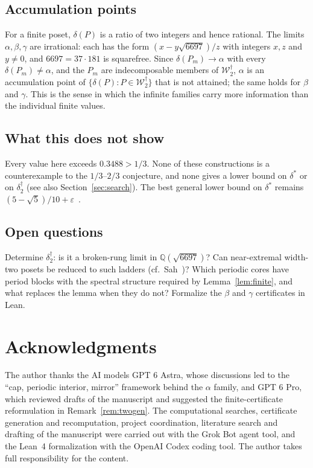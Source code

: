\documentclass[11pt]{amsart}
\theoremstyle{definition}
\theoremstyle{remark}
\newcommand{\Wdag}{\mathcal{W}_2^{\dagger}}
\newcommand{\deltadag}{\delta_2^{\dagger}}
\begin{document}
\subsection*{Accumulation points}
For a finite poset, $\delta(P)$ is a ratio of two integers and hence rational. The limits $\alpha,\beta,\gamma$ are irrational: each has the form $(x-y\sqrt{6697})/z$ with integers $x,z$ and $y\neq0$, and $6697=37\cdot181$ is squarefree. Since $\delta(P_m)\to\alpha$ with every $\delta(P_m)\ne\alpha$, and the $P_m$ are indecomposable members of $\Wdag$, $\alpha$ is an accumulation point of $\{\delta(P):P\in\Wdag\}$ that is not attained; the same holds for $\beta$ and $\gamma$. This is the sense in which the infinite families carry more information than the individual finite values.

\subsection*{What this does not show}
Every value here exceeds $0.3488>1/3$. None of these constructions is a counterexample to the $1/3$--$2/3$ conjecture, and none gives a lower bound on $\delta^*$ or on $\deltadag$ (see also Section~\ref{sec:search}). The best general lower bound on $\delta^*$ remains $(5-\sqrt5)/10+\varepsilon$~\cite{ACPP26}.

\subsection*{Open questions}
Determine $\deltadag$: is it a broken-rung limit in $\mathbb{Q}(\sqrt{6697})$? Can near-extremal width-two posets be reduced to such ladders (cf.\ Sah~\cite[\S5.1]{Sah21})? Which periodic cores have period blocks with the spectral structure required by Lemma~\ref{lem:finite}, and what replaces the lemma when they do not? Formalize the $\beta$ and $\gamma$ certificates in Lean.

\section*{Acknowledgments}
The author thanks the AI models GPT 6 Astra, whose discussions led to the ``cap, periodic interior, mirror'' framework behind the $\alpha$ family, and GPT 6 Pro, which reviewed drafts of the manuscript and suggested the finite-certificate reformulation in Remark~\ref{rem:twogen}. The computational searches, certificate generation and recomputation, project coordination, literature search and drafting of the manuscript were carried out with the Grok Bot agent tool, and the Lean~4 formalization with the OpenAI Codex coding tool. The author takes full responsibility for the content.
\end{document}
